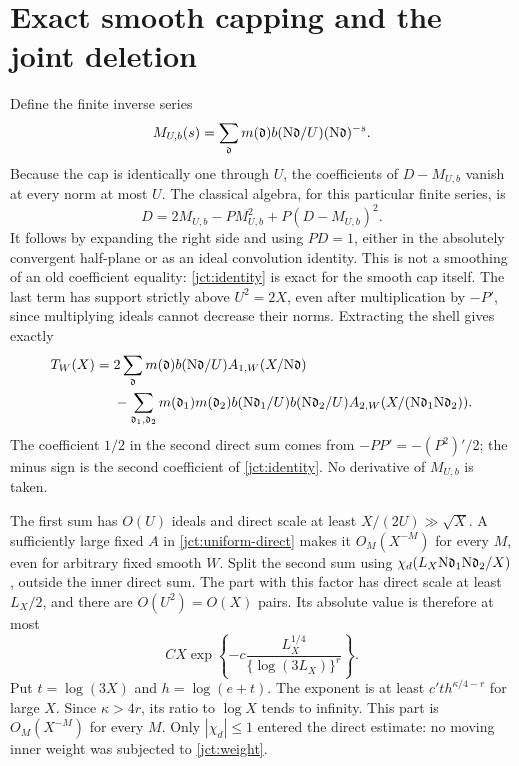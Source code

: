 \section{Exact smooth capping and the joint deletion}
Define the finite inverse series
\[
 M_{U,b}(s)=\sum_{\mathfrak d}m(\mathfrak d)
 b(\mathrm N\mathfrak d/U)(\mathrm N\mathfrak d)^{-s}.
\]
Because the cap is identically one through \(U\), the coefficients
of \(D-M_{U,b}\) vanish at every norm at most \(U\).
The classical algebra, for this particular finite series, is
\begin{equation}
 D=2M_{U,b}-PM_{U,b}^2+P(D-M_{U,b})^2.
 \label{jct:identity}
\end{equation}
It follows by expanding the right side and using \(PD=1\),
either in the absolutely convergent half-plane or as an ideal
convolution identity.  This is not a smoothing of an old
coefficient equality: \eqref{jct:identity} is exact for the smooth
cap itself.
The last term has support strictly above \(U^2=2X\), even after
multiplication by \(-P'\), since multiplying ideals cannot
decrease their norms.  Extracting the shell gives exactly
\begin{equation}
\begin{split}
 T_W(X)={}&2\sum_{\mathfrak d}m(\mathfrak d)b(\mathrm N\mathfrak d/U)
 A_{1,W}(X/\mathrm N\mathfrak d)\\
 &-\sum_{\mathfrak d_1,\mathfrak d_2}
 m(\mathfrak d_1)m(\mathfrak d_2)
 b(\mathrm N\mathfrak d_1/U)b(\mathrm N\mathfrak d_2/U)
 A_{2,W}(X/(\mathrm N\mathfrak d_1\mathrm N\mathfrak d_2)).
 \label{jct:exact-shell}
\end{split}
\end{equation}
The coefficient \(1/2\) in the second direct sum comes from
\(-PP'=-(P^2)'/2\); the minus sign is the second coefficient
of \eqref{jct:identity}.  No derivative of \(M_{U,b}\) is taken.

The first sum has \(O(U)\) ideals and direct scale at least
\(X/(2U)\gg\sqrt X\).  A sufficiently large fixed \(A\) in
\eqref{jct:uniform-direct} makes it \(O_M(X^{-M})\) for every
\(M\), even for arbitrary fixed smooth \(W\).
Split the second sum using
\(\chi_d(L_X\mathrm N\mathfrak d_1\mathrm N\mathfrak d_2/X)\), outside the
inner direct sum.  The part with this factor has direct scale
at least \(L_X/2\), and there are \(O(U^2)=O(X)\) pairs.
Its absolute value is therefore at most
\[
 C X\exp\left\{-c\frac{L_X^{1/4}}{\{\log(3L_X)\}^r}\right\}.
\]
Put \(t=\log(3X)\) and \(h=\log(e+t)\).
The exponent is at least \(c' t h^{\kappa/4-r}\) for large
\(X\).  Since \(\kappa>4r\), its ratio to \(\log X\) tends
to infinity.  This part is \(O_M(X^{-M})\) for every \(M\).
Only \(|\chi_d|\le1\) entered the direct estimate: no moving
inner weight was subjected to \eqref{jct:weight}.

